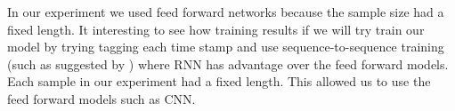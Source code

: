 \documentclass[
12pt, %
english, %
doublespacing, %
headsepline, %
]{MastersDoctoralThesis} %
\begin{document}
In our experiment we used feed forward networks because the sample size had a fixed length. It interesting to see how training results if we will try train our model by trying tagging each time stamp and use sequence-to-sequence training (such as suggested by \cite{graves2012supervised}) where RNN has advantage over the feed forward models.
Each sample in our experiment had a fixed length. This allowed us to use the feed forward models such as CNN. 

 




\appendix %






\end{document}

